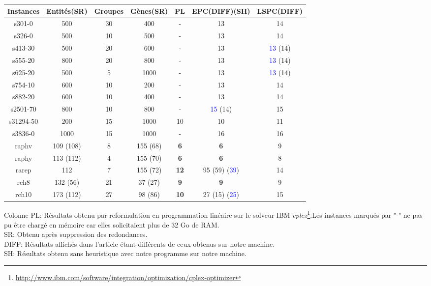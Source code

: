 \begin{center}
\begin{tabular}{|c|c|c|c|c|c|c|}
\hline 
Instances & Entités(SR) & Groupes & Gènes(SR) & PL & EPC(DIFF)(SH) & LSPC(DIFF) \\ 
\hline 
s301-0 & 500 & 30 & 400 & - & 13 & 14 \\ 
\hline 
s326-0 & 500 & 10 & 500 & - & 13 & 14 \\ 
\hline 
s413-30 & 500 & 20 & 600 & - & 13 & \textcolor{blue}{13} (14) \\ 
\hline 
s555-20 & 800 & 20 & 800 & - & 13 & \textcolor{blue}{13} (14) \\ 
\hline 
s625-20 & 500 & 5 & 1000 & - & 13 & \textcolor{blue}{13} (14) \\ 
\hline 
s754-10 & 600 & 10 & 200 & - & 13 & 14 \\ 
\hline 
s882-20 & 600 & 10 & 400 & - & 13 & 14 \\ 
\hline 
s2501-70 & 800 & 10 & 800 & - & \textcolor{blue}{15} (14) & 15 \\ 
\hline 
s31294-50 & 200 & 15 & 1000 & 10 & 10 & 11 \\ 
\hline 
s3836-0 & 1000 & 15 & 1000 & - & 16 & 16 \\ 
\hline 
raphv & 109 (108) & 8 & 155 (68) & \textbf{6} & \textbf{6} & 9 \\ 
\hline 
raphy & 113 (112) & 4 & 155 (70) & \textbf{6} & \textbf{6} & 8 \\ 
\hline 
rarep & 112 & 7 & 155 (72) & \textbf{12} & 95 (59) (\textcolor{blue}{39}) & 14 \\ 
\hline 
rch8 & 132 (56) & 21 & 37 (27) & \textbf{9} & \textbf{9} & 9 \\ 
\hline 
rch10 & 173 (112) & 27 & 98 (86) & \textbf{10} & 27 (15) (\textcolor{blue}{25}) & 15 \\ 
\hline 
\end{tabular} 
\end{center}
Colonne PL: Résultats obtenu par reformulation en programmation linéaire sur le solveur IBM \textit{cplex}\footnote{\url{http://www.ibm.com/software/integration/optimization/cplex-optimizer}}.Les instances marqués par "-" ne pas pu être chargé en mémoire car elles solicitaient plus de 32 Go de RAM.\\
SR: Obtenu après suppression des redondances.\\
DIFF: Résultats affichés dans l'article étant différents de ceux obtenus sur notre machine.\\
SH: Résultats obtenu sans heuristique avec notre programme sur notre machine.\\


